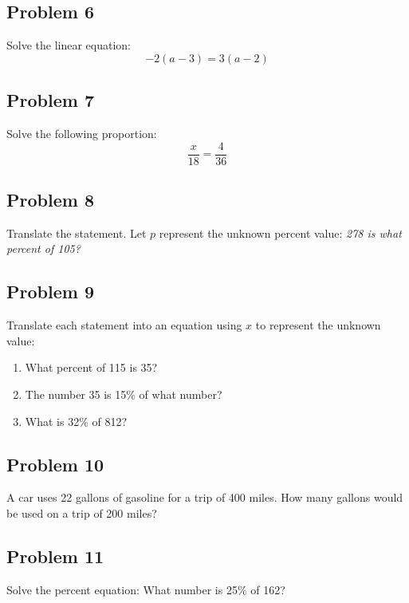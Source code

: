 \documentclass[12pt]{article}
\begin{document}
\begin{center}
\end{center}

\subsection*{Problem 6}
Solve the linear equation:  
\[
-2(a - 3) = 3(a - 2)
\]

\subsection*{Problem 7}
Solve the following proportion:  
\[
\frac{x}{18} = \frac{4}{36}
\]

\subsection*{Problem 8}
Translate the statement. Let $p$ represent the unknown percent value:  
\textit{278 is what percent of 105?}

\subsection*{Problem 9}
Translate each statement into an equation using \( x \) to represent the unknown value:
\begin{enumerate}[label=(\alph*)]
    \item What percent of 115 is 35?
    \item The number 35 is 15\% of what number?
    \item What is 32\% of 812?
\end{enumerate}


\subsection*{Problem 10}
A car uses 22 gallons of gasoline for a trip of 400 miles.  
How many gallons would be used on a trip of 200 miles?

\subsection*{Problem 11}
Solve the percent equation:  
What number is 25\% of 162?
\end{document}
